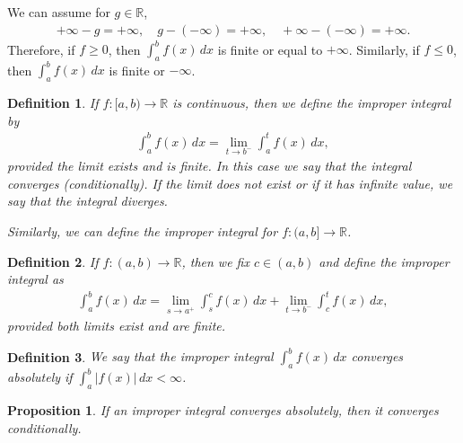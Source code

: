 \documentclass[11pt]{book}
\newtheorem{definition}{Definition}[chapter]
\newtheorem{proposition}{Proposition}[chapter]
\theoremstyle{definition}
\numberwithin{equation}{chapter}
\begin{document}
\medskip

We can assume for $g \in \mathbb{R}$,
\begin{align*}
    + \infty - g = + \infty, \quad g - (-\infty) = + \infty, \quad + \infty - (- \infty) = + \infty.
\end{align*}
Therefore, if $f \geq 0$, then $\int^b_a f(x) \,dx$ is finite or equal to $+ \infty$. Similarly, if $f \leq 0$, then $\int^b_a f(x) \,dx$ is finite or $- \infty$.

\medskip

\begin{definition}
If $f: [a,b) \to \mathbb{R}$ is continuous, then we define the improper integral by
\begin{align*}
    \int^b_a f(x) \,dx = \lim_{t \to b^-} \int^t_a f(x) \,dx,
\end{align*}
provided the limit exists and is finite. In this case we say that the integral converges (conditionally). If the limit does not exist or if it has infinite value, we say that the integral diverges.

Similarly, we can define the improper integral for $f:(a,b] \to \mathbb{R}$. 
\end{definition}

\medskip

\begin{definition}
If $f:(a,b) \to \mathbb{R}$, then we fix $c \in (a,b)$ and define the improper integral as
\begin{align*}
    \int^b_a f(x) \,dx = \lim_{s \to a^+} \int^c_s f(x) \,dx + \lim_{t \to b^-} \int^t_c f(x) \,dx,
\end{align*}
provided both limits exist and are finite.
\end{definition}

\medskip

\begin{definition}
We say that the improper integral $\int^b_a f(x) \,dx$ converges absolutely if $\int^b_a \left|f(x)\right| \,dx < \infty$.
\end{definition}

\begin{proposition}
If an improper integral converges absolutely, then it converges conditionally.
\end{proposition}

\medskip
\end{document}
